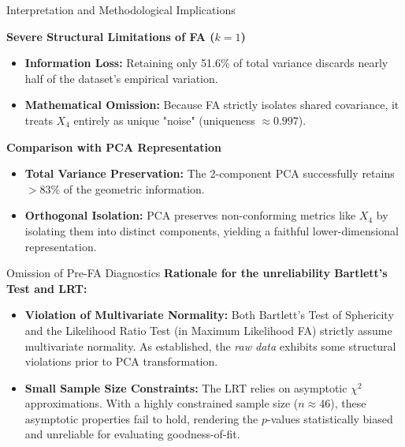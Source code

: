 \documentclass[8pt, aspectratio=169]{beamer}
\begin{document}
\begin{frame}{Interpretation and Methodological Implications}

\vspace{0.3cm}
\textbf{Severe Structural Limitations of FA ($k=1$)}
\begin{itemize}
    \item \textbf{Information Loss:} Retaining only 51.6\% of total variance discards nearly half of the dataset's empirical variation.
    \item \textbf{Mathematical Omission:} Because FA strictly isolates shared covariance, it treats $X_4$ entirely as unique "noise" (uniqueness $\approx 0.997$).
\end{itemize}

\vspace{0.3cm}
\textbf{Comparison with PCA Representation}
\begin{itemize}
    \item \textbf{Total Variance Preservation:} The 2-component PCA successfully retains $>83\%$ of the geometric information.
    \item \textbf{Orthogonal Isolation:} PCA preserves non-conforming metrics like $X_4$ by isolating them into distinct components, yielding a faithful lower-dimensional representation.
\end{itemize}

\end{frame}

\begin{frame}{Omission of Pre-FA Diagnostics}
    \textbf{Rationale for the unreliability Bartlett's Test and LRT:}
    \vspace{0.2cm}
    
    \begin{itemize}
        \item \textbf{Violation of Multivariate Normality:} Both Bartlett's Test of Sphericity and the Likelihood Ratio Test (in Maximum Likelihood FA) strictly assume multivariate normality. As established, the \textit{raw data} exhibits some structural violations prior to PCA transformation.
        
        \item \textbf{Small Sample Size Constraints:} The LRT relies on asymptotic $\chi^2$ approximations. With a highly constrained sample size ($n \approx 46$), these asymptotic properties fail to hold, rendering the $p$-values statistically biased and unreliable for evaluating goodness-of-fit.
        
    \end{itemize}
\end{frame}
\end{document}
